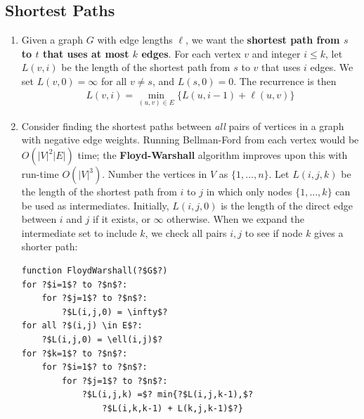 \documentclass[10pt]{article}
\begin{document}
\begin{multicols}{2}
\begin{addmargin}[0.8em]{0.5em}
    \vspace{-0.4cm}
    \subsection{Shortest Paths}
    \vspace{-0.2cm}
    \begin{enumerate}[label=(\alph*)]
        \item Given a graph $G$ with edge lengths $\ell$, we want the \textbf{shortest path from $s$ to $t$ that uses at most $k$ edges}. For each vertex $v$ and integer $i \leq k$, let $L(v,i)$ be the length of the shortest path from $s$ to $v$ that uses $i$ edges. We set $L(v,0) = \infty$ for all $v \neq s$, and $L(s,0) = 0$. The recurrence is then
        \begin{align*}
        L(v,i) = \min_{(u,v) \in E} \{ L(u,i-1) + \ell(u,v) \}
        \end{align*}
        \item Consider finding the shortest paths between \textit{all} pairs of vertices in a graph with negative edge weights. Running Bellman-Ford from each vertex would be $O(|V|^2|E|)$ time; the \textbf{Floyd-Warshall} algorithm improves upon this with run-time $O(|V|^3)$. Number the vertices in $V$ as $\{ 1, \hdots, n\}$. Let $L(i,j,k)$ be the length of the shortest path from $i$ to $j$ in which only nodes $\{ 1, \hdots, k \}$ can be used as intermediates. Initially, $L(i, j, 0)$ is the length of the direct edge between $i$ and $j$ if it exists, or $\infty$ otherwise. When we expand the intermediate set to include $k$, we check all pairs $i,j$ to see if node $k$ gives a shorter path:
        \begin{verbatim}
function FloydWarshall(?$G$?)
for ?$i=1$? to ?$n$?:
    for ?$j=1$? to ?$n$?:
        ?$L(i,j,0) = \infty$?
for all ?$(i,j) \in E$?:
    ?$L(i,j,0) = \ell(i,j)$?
for ?$k=1$? to ?$n$?:
    for ?$i=1$? to ?$n$?:
        for ?$j=1$? to ?$n$?:
            ?$L(i,j,k) =$? min{?$L(i,j,k-1),$? 
                ?$L(i,k,k-1) + L(k,j,k-1)$?}
        \end{verbatim}
        

\end{enumerate}
\end{addmargin}
\end{multicols}
\end{document}
